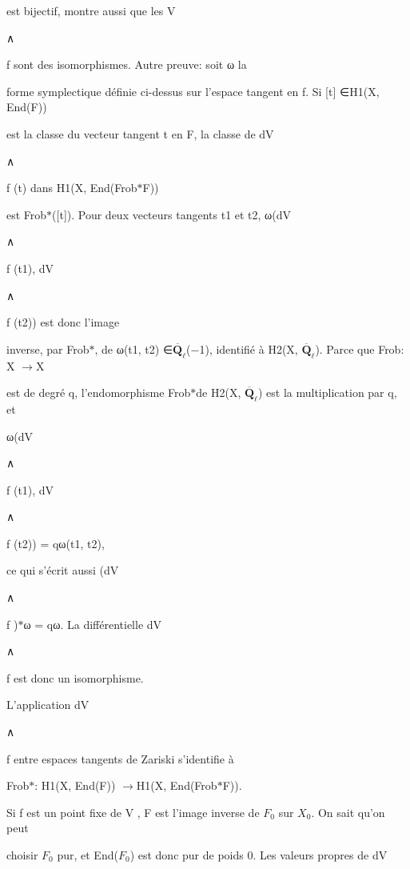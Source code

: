 \documentclass[11pt]{article}
\begin{document}
\noindent est bijectif, montre aussi que les V\par
\noindent ∧\par
\noindent f sont des isomorphismes. Autre preuve: soit ω la\par
\noindent forme symplectique définie ci-dessus sur l’espace tangent en f. Si [t] ∈H1(X, End(F))\par
\noindent est la classe du vecteur tangent t en F, la classe de dV\par
\noindent ∧\par
\noindent f (t) dans H1(X, End(Frob\(*\)F))\par
\noindent est Frob\(*\)([t]). Pour deux vecteurs tangents t1 et t2, ω(dV\par
\noindent ∧\par
\noindent f (t1), dV\par
\noindent ∧\par
\noindent f (t2)) est donc l’image\par
\noindent inverse, par Frob\(*\), de ω(t1, t2) ∈\(\overline{\mathbf Q}_{\ell}\)(−1), identifié à H2(X, \(\overline{\mathbf Q}_{\ell}\)). Parce que Frob: X \(\to\)X\par
\noindent est de degré q, l’endomorphisme Frob\(*\)de H2(X, \(\overline{\mathbf Q}_{\ell}\)) est la multiplication par q, et\par
\noindent ω(dV\par
\noindent ∧\par
\noindent f (t1), dV\par
\noindent ∧\par
\noindent f (t2)) = qω(t1, t2),\par
\noindent ce qui s’écrit aussi (dV\par
\noindent ∧\par
\noindent f )\(*\)ω = qω. La différentielle dV\par
\noindent ∧\par
\noindent f est donc un isomorphisme.\par
\noindent L’application dV\par
\noindent ∧\par
\noindent f entre espaces tangents de Zariski s’identifie à\par
\noindent Frob\(*\): H1(X, End(F)) \(\to\)H1(X, End(Frob\(*\)F)).\par
\noindent Si f est un point fixe de V , F est l’image inverse de \(F_0\) sur \(X_0\). On sait qu’on peut\par
\noindent choisir \(F_0\) pur, et End(\(F_0\)) est donc pur de poids 0. Les valeurs propres de dV\par
\end{document}
